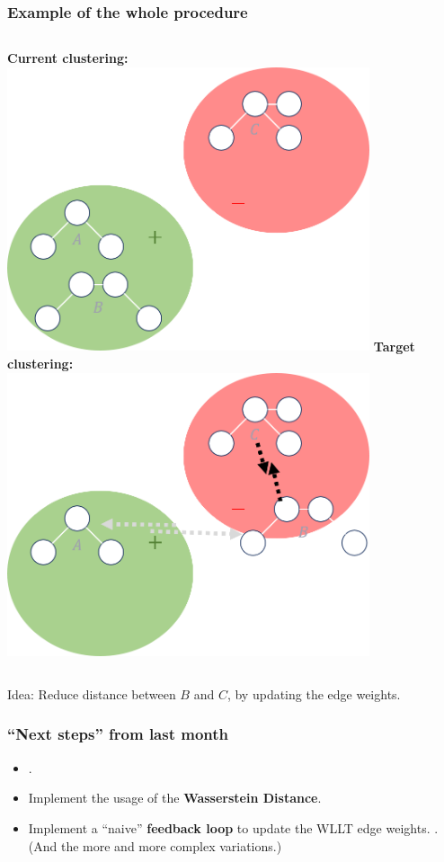 \begin{frame}
	\frametitle{Example of the whole procedure}	
	\begin{columns}[T]%
			\centering
			\textbf{Current clustering:}\\
			\vspace{0.5cm}
			\includegraphics[width=0.8\textwidth]{images/Classification1}
			\centering
			\textbf{Target clustering:}\\
			\vspace{0.5cm}
			\includegraphics[width=0.8\textwidth]{images/Classification2}
	\end{columns}
	\vspace{0.5cm}
	Idea: Reduce distance between $B$ and $C$, by updating the edge weights.
\end{frame}

\begin{frame}
	\frametitle{\enquote{Next steps} from last month}
	\begin{itemize}
		\item[] . \newline
		\item Implement the usage of the \textbf{Wasserstein Distance}.\newline
		
		\item Implement a \enquote{naive} \textbf{feedback loop} to update the WLLT edge weights.\newline
		.\\
		(And the more and more complex variations.)
	\end{itemize}	
\end{frame}

